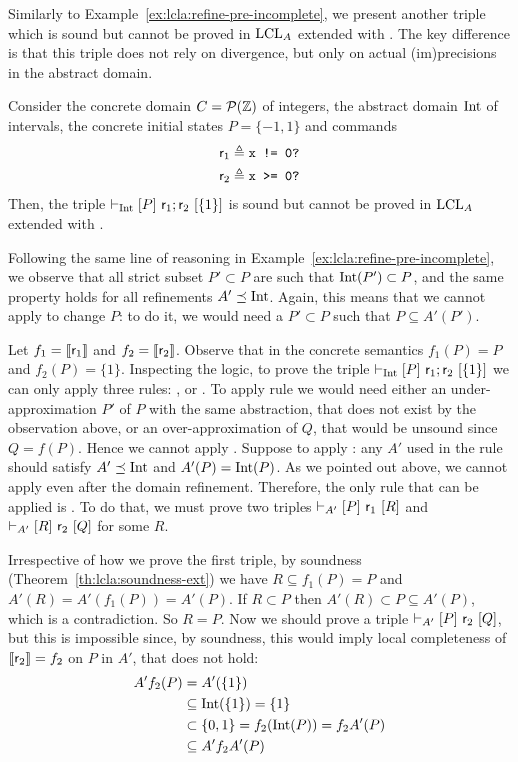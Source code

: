 \begin{example}\label{ex:app:refine-pre-incomplete-2-appendix}
	Similarly to Example~\ref{ex:lcla:refine-pre-incomplete}, we present another triple which is sound but cannot be proved in $\text{LCL}_A$ extended with . The key difference is that this triple does not rely on divergence, but only on actual (im)precisions in the abstract domain.
	
	Consider the concrete domain $C = \mathcal{P}(\mathbb{Z})$ of integers, the abstract domain $\text{Int}$ of intervals, the concrete initial states $P = \{ -1, 1 \}$ and commands
	\begin{align*}
		\mathsf{r}_1 &\triangleq \texttt{x != 0?} \\
		\mathsf{r}_2 &\triangleq \texttt{x >= 0?}
	\end{align*}
	Then, the triple $\vdash_{\text{Int}}\nobreak[P]~\mathsf{r}_1; \mathsf{r}_2~[\{ 1 \}]$ is sound but cannot be proved in $\text{LCL}_A$ extended with .
	
	Following the same line of reasoning in Example~\ref{ex:lcla:refine-pre-incomplete}, we observe that all strict subset $P' \subset P$ are such that $\text{Int}(P') \subset P$, and the same property holds for all refinements $A' \preceq \text{Int}$. Again, this means that we cannot apply  to change $P$: to do it, we would need a $P' \subset P$ such that $P \subseteq A'(P')$.

	Let $f_1 = \llbracket\mathsf{r}_1\rrbracket$ and $f_2 = \llbracket\mathsf{r}_2\rrbracket$. Observe that in the concrete semantics $f_1(P) = P$ and $f_2(P) = \{ 1 \}$.
	Inspecting the logic, to prove the triple $\vdash_{\text{Int}}\nobreak[P]~\mathsf{r}_1; \mathsf{r}_2~[\{ 1 \}]$ we can only apply three rules: ,  or .
	To apply rule  we would need either an under\hyp{}approximation $P'$ of $P$ with the same abstraction, that does not exist by the observation above, or an over\hyp{}approximation of $Q$, that would be unsound since $Q = f(P)$. Hence we cannot apply . Suppose to apply : any $A'$ used in the rule should satisfy $A' \preceq \text{Int}$ and $A'(P) = \text{Int}(P)$. As we pointed out above, we cannot apply  even after the domain refinement. Therefore, the only rule that can be applied is . To do that, we must prove two triples $\vdash_{A'}\nobreak[P]~\mathsf{r}_1~[R]$ and $\vdash_{A'}\nobreak[R]~\mathsf{r}_2~[Q]$ for some $R$.
	
	Irrespective of how we prove the first triple, by soundness (Theorem~\ref{th:lcla:soundness-ext}) we have $R \subseteq f_1(P) = P$ and $A'(R) = A'(f_1(P)) = A'(P)$. If $R \subset P$ then $A'(R) \subset P \subseteq A'(P)$, which is a contradiction. So $R = P$.
	Now we should prove a triple $\vdash_{A'}\nobreak[P]~\mathsf{r}_2~[Q]$, but this is impossible since, by soundness, this would imply local completeness of $\llbracket\mathsf{r}_2\rrbracket = f_2$ on $P$ in $A'$, that does not hold:
	\begin{align*}
		A' f_2(P) &= A'(\{ 1 \}) \\
		&\subseteq \text{Int}(\{ 1 \}) = \{ 1 \} \\
		&\subset \{ 0, 1 \} = f_2(\text{Int}(P)) = f_2 A'(P) \\
		&\subseteq A' f_2 A'(P)
	\end{align*}
	

\end{example}
